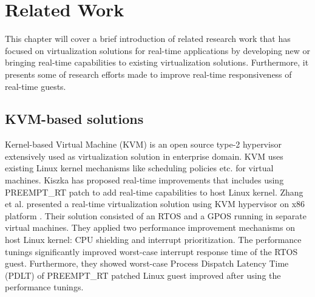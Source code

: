 \chapter{Related Work\label{chap5}}


This chapter will cover a brief introduction of related research work that has focused on virtualization solutions
for real-time applications by developing new or bringing real-time capabilities to existing virtualization
solutions. Furthermore, it presents some of research efforts made to improve real-time responsiveness of real-time guests.



\section{KVM-based solutions}
Kernel-based Virtual Machine (KVM) is an open source type-2 hypervisor extensively used as virtualization solution in enterprise domain.
KVM uses existing Linux kernel mechanisms like scheduling policies etc. for virtual machines. 
Kiszka \cite{kiszka2009towards} has proposed real-time improvements that includes using PREEMPT\_RT patch to add real-time capabilities to host Linux kernel.
Zhang et al. presented a real-time virtualization solution using KVM hypervisor on x86 platform \cite{zuo2010performance}.
Their solution consisted of an RTOS and a GPOS running in separate virtual machines. 
They applied two performance improvement mechanisms on host Linux kernel: CPU shielding and interrupt prioritization.
The performance tunings significantly improved worst-case interrupt response time of the RTOS guest.
Furthermore, they showed worst-case Process Dispatch Latency Time (PDLT) of PREEMPT\_RT patched Linux guest improved after using the performance tunings.

